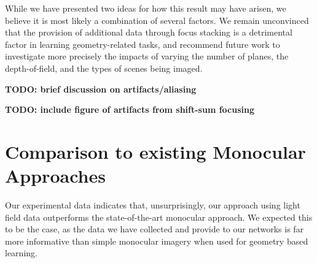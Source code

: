 While we have presented two ideas for how this result may have arisen, we believe it is most likely a combination of several factors. We remain unconvinced that the provision of additional data through focus stacking is a detrimental factor in learning geometry-related tasks, and recommend future work to investigate more precisely the impacts of varying the number of planes, the depth-of-field, and the types of scenes being imaged.

\textbf{TODO: brief discussion on artifacts/aliasing}

\textbf{TODO: include figure of artifacts from shift-sum focusing}

\section{Comparison to existing Monocular Approaches}

Our experimental data indicates that, unsurprisingly, our approach using light field data outperforms the state-of-the-art monocular approach. We expected this to be the case, as the data we have collected and provide to our networks is far more informative than simple monocular imagery when used for geometry based learning. 
